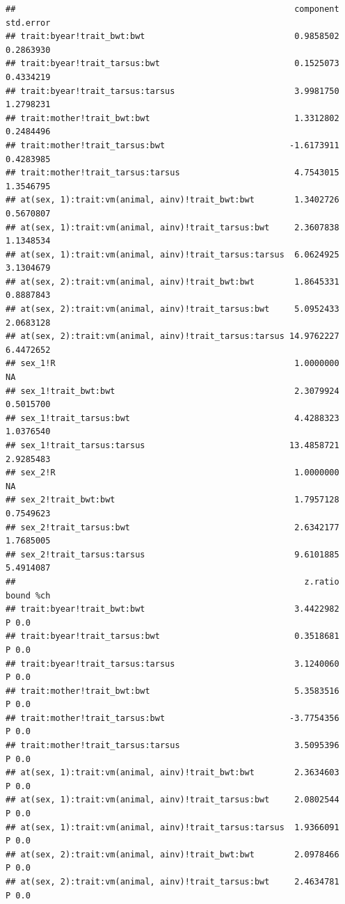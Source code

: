 \documentclass[
  12pt,
]{book}
\begin{document}
\begin{verbatim}
##                                                        component std.error
## trait:byear!trait_bwt:bwt                              0.9858502 0.2863930
## trait:byear!trait_tarsus:bwt                           0.1525073 0.4334219
## trait:byear!trait_tarsus:tarsus                        3.9981750 1.2798231
## trait:mother!trait_bwt:bwt                             1.3312802 0.2484496
## trait:mother!trait_tarsus:bwt                         -1.6173911 0.4283985
## trait:mother!trait_tarsus:tarsus                       4.7543015 1.3546795
## at(sex, 1):trait:vm(animal, ainv)!trait_bwt:bwt        1.3402726 0.5670807
## at(sex, 1):trait:vm(animal, ainv)!trait_tarsus:bwt     2.3607838 1.1348534
## at(sex, 1):trait:vm(animal, ainv)!trait_tarsus:tarsus  6.0624925 3.1304679
## at(sex, 2):trait:vm(animal, ainv)!trait_bwt:bwt        1.8645331 0.8887843
## at(sex, 2):trait:vm(animal, ainv)!trait_tarsus:bwt     5.0952433 2.0683128
## at(sex, 2):trait:vm(animal, ainv)!trait_tarsus:tarsus 14.9762227 6.4472652
## sex_1!R                                                1.0000000        NA
## sex_1!trait_bwt:bwt                                    2.3079924 0.5015700
## sex_1!trait_tarsus:bwt                                 4.4288323 1.0376540
## sex_1!trait_tarsus:tarsus                             13.4858721 2.9285483
## sex_2!R                                                1.0000000        NA
## sex_2!trait_bwt:bwt                                    1.7957128 0.7549623
## sex_2!trait_tarsus:bwt                                 2.6342177 1.7685005
## sex_2!trait_tarsus:tarsus                              9.6101885 5.4914087
##                                                          z.ratio bound %ch
## trait:byear!trait_bwt:bwt                              3.4422982     P 0.0
## trait:byear!trait_tarsus:bwt                           0.3518681     P 0.0
## trait:byear!trait_tarsus:tarsus                        3.1240060     P 0.0
## trait:mother!trait_bwt:bwt                             5.3583516     P 0.0
## trait:mother!trait_tarsus:bwt                         -3.7754356     P 0.0
## trait:mother!trait_tarsus:tarsus                       3.5095396     P 0.0
## at(sex, 1):trait:vm(animal, ainv)!trait_bwt:bwt        2.3634603     P 0.0
## at(sex, 1):trait:vm(animal, ainv)!trait_tarsus:bwt     2.0802544     P 0.0
## at(sex, 1):trait:vm(animal, ainv)!trait_tarsus:tarsus  1.9366091     P 0.0
## at(sex, 2):trait:vm(animal, ainv)!trait_bwt:bwt        2.0978466     P 0.0
## at(sex, 2):trait:vm(animal, ainv)!trait_tarsus:bwt     2.4634781     P 0.0

\end{verbatim}
\end{document}
